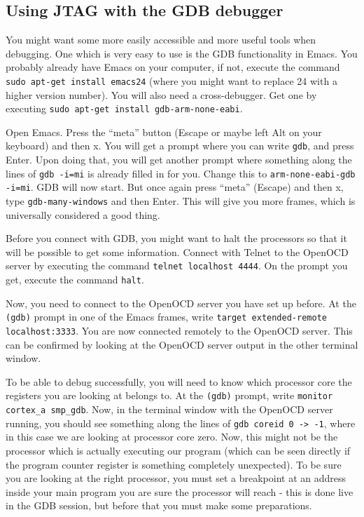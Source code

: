 \documentclass[a4paper,11pt,reqno]{amsart}
\begin{document}
{\subsection{Using JTAG with the GDB debugger}
You might want some more easily accessible and more useful tools when debugging. One which is very easy to use is the GDB functionality in Emacs. You probably already have Emacs on your computer, if not, execute the command \texttt{sudo apt-get install emacs24} (where you might want to replace 24 with a higher version number). You will also need a cross-debugger. Get one by executing \texttt{sudo apt-get install gdb-arm-none-eabi}.

Open Emacs. Press the ``meta'' button (Escape or maybe left Alt on your keyboard) and then x. You will get a prompt where you can write \texttt{gdb}, and press Enter. Upon doing that, you will get another prompt where something along the lines of \texttt{gdb -i=mi} is already filled in for you. Change this to \texttt{arm-none-eabi-gdb -i=mi}. GDB will now start. But once again press ``meta'' (Escape) and then x, type \texttt{gdb-many-windows} and then Enter. This will give you more frames, which is universally considered a good thing.

Before you connect with GDB, you might want to halt the processors so that it will be possible to get some information. Connect with Telnet to the OpenOCD server by executing the command \texttt{telnet localhost 4444}. On the prompt you get, execute the command \texttt{halt}.

Now, you need to connect to the OpenOCD server you have set up before. At the \texttt{(gdb)} prompt in one of the Emacs frames, write \texttt{target extended-remote localhost:3333}. You are now connected remotely to the OpenOCD server. This can be confirmed by looking at the OpenOCD server output in the other terminal window.

To be able to debug successfully, you will need to know which processor core the registers you are looking at belongs to. At the \texttt{(gdb)} prompt, write \texttt{monitor cortex\_a smp\_gdb}. Now, in the terminal window with the OpenOCD server running, you should see something along the lines of \texttt{gdb coreid  0 -> -1}, where in this case we are looking at processor core zero. Now, this might not be the processor which is actually executing our program (which can be seen directly if the program counter register is something completely unexpected). To be sure you are looking at the right processor, you must set a breakpoint at an address inside your main program you are sure the processor will reach - this is done live in the GDB session, but before that you must make some preparations.

}
\end{document}
